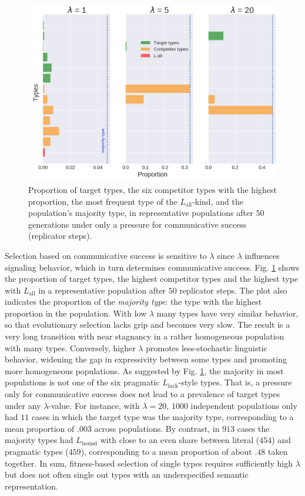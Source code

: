 \documentclass[a4paper, 11pt]{article}
\theoremstyle{Satz}
\newcommand{\mylang}[1]{\ensuremath{L_{\text{#1}}}\xspace} %
\newcommand{\Lall}{\mylang{all}}
\newcommand{\Lbound}{\mylang{bound}}
\newcommand{\Llack}{\mylang{lack}}
\begin{document}
\begin{figure}[t]
\centering
\includegraphics[width=\textwidth,height=8cm, keepaspectratio]{./plots/barh-onlyr}
\caption{Proportion of target types, the six competitor types with the highest proportion, the
  most frequent type of the $\Lall$-kind, and the population's majority type, in representative
  populations after $50$ generations under only a pressure for communicative success
  (replicator steps).}
\label{fig:only-R}
\end{figure}

Selection based on communicative success is sensitive to $\lambda$ since $\lambda$ influences
signaling behavior, which in turn determines communicative success. Fig. \ref{fig:only-R} shows
the proportion of target types, the highest competitor types and the highest type with $\Lall$
in a representative population after $50$ replicator steps. The plot also indicates the
proportion of the \emph{majority type}: the type with the highest proportion in the
population. With low $\lambda$ many types have very similar behavior, so that evolutionary
selection lacks grip and becomes very slow. The result is a very long transition with near
stagnancy in a rather homogeneous population with many types. Conversely, higher $\lambda$
promotes less-stochastic linguistic behavior, widening the gap in expressivity between some
types and promoting more homogeneous populations. As suggested by Fig. \ref{fig:only-R}, the
majority in most populations is not one of the six pragmatic $\Llack$-style types. That is, a
pressure only for communicative success does not lead to a prevalence of target types under any
$\lambda$-value. For instance, with $\lambda = 20$, $1000$ independent populations only had $11$
cases in which the target type was the majority type, corresponding to a mean proportion of
$.003$ across populations. By contrast, in $913$ cases the majority types had $\Lbound$ with
close to an even share between literal ($454$) and pragmatic types ($459$), corresponding to a
mean proportion of about $.48$ taken together. In sum, fitness-based selection of single types
requires sufficiently high $\lambda$ but does not often single out types with an underspecified
semantic representation.
\end{document}
